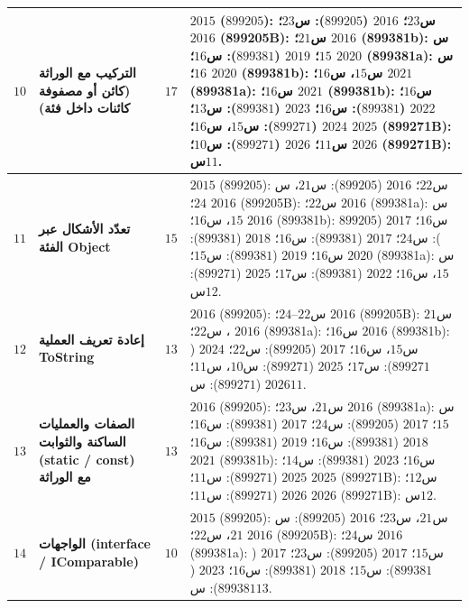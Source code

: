 \documentclass[14pt]{extarticle}
\begin{document}
{\begin{longtable}{|C{0.05\textwidth}|>{\raggedleft\arraybackslash}p{0.27\textwidth}|C{0.09\textwidth}|>{\raggedleft\arraybackslash}p{0.47\textwidth}|}
$10$ &
\textbf{التركيب مع الوراثة (كائن أو مصفوفة كائنات داخل فئة)} &
\textbf{$17$} &
$2015$ ($899205$): س$23$؛
$2016$ ($899205$): س$23$؛
$2016$ (\textenglish{899205B}): س$21$؛
$2016$ (\textenglish{899381b}): س$15$؛
$2019$ ($899381$): س$16$؛
$2020$ (\textenglish{899381a}): س$16$؛
$2020$ (\textenglish{899381b}): س$15$، س$16$؛
$2021$ (\textenglish{899381a}): س$16$؛
$2021$ (\textenglish{899381b}): س$16$؛
$2022$ ($899381$): س$16$؛
$2023$ ($899381$): س$13$؛
$2024$ ($899271$): س$15$، س$16$؛
$2025$ (\textenglish{899271B}): س$11$؛
$2026$ ($899271$): س$10$؛
$2026$ (\textenglish{899271B}): س$11$. \\
\hline

$11$ &
\textbf{تعدّد الأشكال عبر الفئة \textenglish{Object}} &
\textbf{$15$} &
$2015$ ($899205$): س$22$؛
$2016$ ($899205$): س$21$، س$24$؛
$2016$ (\textenglish{899205B}): س$22$؛
$2016$ (\textenglish{899381a}): س$15$، س$16$؛
$2016$ (\textenglish{899381b}): س$16$؛
$2017$ ($899205$): س$24$؛
$2017$ ($899381$): س$16$؛
$2018$ ($899381$): س$16$؛
$2019$ ($899381$): س$15$؛
$2020$ (\textenglish{899381a}): س$15$، س$16$؛
$2022$ ($899381$): س$17$؛
$2025$ ($899271$): س$12$. \\
\hline

$12$ &
\textbf{إعادة تعريف العملية \textenglish{ToString}} &
\textbf{$13$} &
$2016$ ($899205$): س$22$--$24$؛
$2016$ (\textenglish{899205B}): س$21$، س$22$؛
$2016$ (\textenglish{899381a}): س$16$؛
$2016$ (\textenglish{899381b}): س$15$، س$16$؛
$2017$ ($899205$): س$22$؛
$2024$ ($899271$): س$17$؛
$2025$ ($899271$): س$10$، س$11$؛
$2026$ ($899271$): س$11$. \\
\hline

$13$ &
\textbf{الصفات والعمليات الساكنة والثوابت (\textenglish{static} / \textenglish{const}) مع الوراثة} &
\textbf{$13$} &
$2016$ ($899205$): س$21$، س$23$؛
$2016$ (\textenglish{899381a}): س$15$؛
$2017$ ($899205$): س$24$؛
$2017$ ($899381$): س$16$؛
$2018$ ($899381$): س$16$؛
$2019$ ($899381$): س$16$؛
$2021$ (\textenglish{899381b}): س$16$؛
$2023$ ($899381$): س$14$؛
$2025$ ($899271$): س$11$؛
$2025$ (\textenglish{899271B}): س$12$؛
$2026$ ($899271$): س$11$؛
$2026$ (\textenglish{899271B}): س$12$. \\
\hline

$14$ &
\textbf{الواجهات (\textenglish{interface} / \textenglish{IComparable})} &
\textbf{$10$} &
$2015$ ($899205$): س$21$، س$23$؛
$2016$ ($899205$): س$21$، س$22$؛
$2016$ (\textenglish{899205B}): س$24$؛
$2016$ (\textenglish{899381a}): س$15$؛
$2017$ ($899205$): س$23$؛
$2017$ ($899381$): س$15$؛
$2018$ ($899381$): س$16$؛
$2023$ ($899381$): س$13$. \\
\hline


\end{longtable}}
\end{document}
